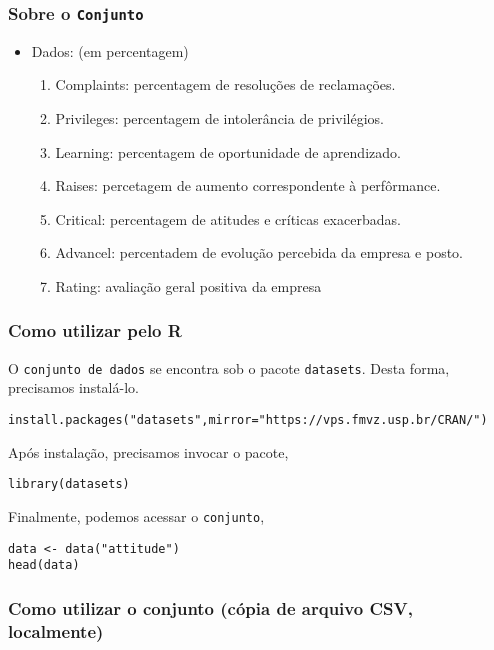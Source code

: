 \documentclass[11pt]{article}
\begin{document}
\subsubsection{Sobre o \texttt{Conjunto}}
\label{sec:orga52c057}
\begin{itemize}
\item Dados: (em percentagem)
\begin{enumerate}
\item Complaints: percentagem de resoluções de reclamações.
\item Privileges: percentagem de intolerância de privilégios.
\item Learning: percentagem de oportunidade de aprendizado.
\item Raises: percetagem de aumento correspondente à perfôrmance.
\item Critical: percentagem de atitudes e críticas exacerbadas.
\item Advancel: percentadem de evolução percebida da empresa e posto.
\item Rating: avaliação geral positiva da empresa
\end{enumerate}
\end{itemize}

\subsubsection{Como utilizar pelo R}
\label{sec:orgf6505ab}
O \texttt{conjunto de dados} se encontra sob o pacote \texttt{datasets}. Desta forma, precisamos
instalá-lo.

\begin{verbatim}
install.packages("datasets",mirror="https://vps.fmvz.usp.br/CRAN/")
\end{verbatim}

Após instalação, precisamos invocar o pacote,
\begin{verbatim}
library(datasets)
\end{verbatim}

Finalmente, podemos acessar o \texttt{conjunto},
\begin{verbatim}
data <- data("attitude")
head(data)
\end{verbatim}
\subsubsection{Como utilizar o conjunto (cópia de arquivo CSV, localmente)}
\label{sec:org07bfea0}
\end{document}

